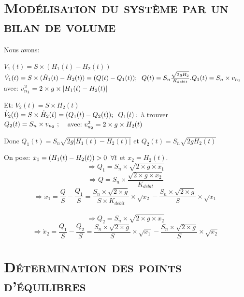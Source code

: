 \section{\textsc{Modélisation du système par un bilan de volume}}

	Nous avons:
\begin{center}

   $ V_1(t)=S\times (H_1(t)-H_2(t))$\\[0.5cm]   
    
  $\dot{V}_1(t)= S \times (\dot{H}_1(t)-\dot{H}_2(t))=(Q(t)-Q_1(t)); \hspace{2mm} Q(t) = S_n \frac{\sqrt{2gH_2}} {K_{debit}}.\\[0.5cm]
  
    Q_1(t)=S_n \times v_{n_1} \hspace{3mm}$ avec:$\hspace{1mm}  v^2_{n_1} = 2 \times g\times |H_1(t)-H_2(t)| \\[1 cm]$
 
 Et:
    $V_2(t)=S\times H_2(t)$\\[0.5cm]

   $ \dot{V}_2(t) = S \times \dot{H}_2(t)=(Q_1(t)-Q_2(t)); \hspace{2mm} Q_1(t):$ à trouver\\[0.5cm]
    
    $Q_2(t) = S_n \times v_{n_2} \ ; \hspace{3mm}$ avec:$\hspace{1mm}  v^2_{n_2} = 2 \times g \times H_2(t)    \\[1 cm]$
\end{center} 


Donc $Q_1(t)=S_n\sqrt{2g |H_1(t)-H_2(t)|}$ et $ Q_2(t)=S_n\sqrt{2gH_2(t)} $\\
\par On pose:  $ x_1 = (H_1(t) - H_2(t)) > 0 \hspace{2mm} \forall t$ et $ x_2 = H_2(t) $.\\

\[\Longrightarrow Q_1=S_n\times \sqrt{2\times g \times x_1}\]
\[\Longrightarrow Q=S_n\times \frac{\sqrt{2\times g \times x_2}}{K_{debit}} \]
\[\Longrightarrow \dot{x}_1=\frac{Q}{S}-\frac{Q_1}{S}= \frac{S_n\times \sqrt{2\times g }}{S \times K_{debit} } \times \sqrt{x_2} - \frac{S_n\times \sqrt{2\times g }}{S} \times \sqrt{x_1} \] \\[0.5 cm]

\[\Longrightarrow Q_2=S_n\times \sqrt{2\times g \times x_2}\]
\[\Longrightarrow \dot{x}_2=\frac{Q_1}{S}-\frac{Q_2}{S}= \frac{S_n\times \sqrt{2\times g }}{S} \times \sqrt{x_1} - \frac{S_n\times \sqrt{2\times g }}{S} \times \sqrt{x_2} \]
 

\section{\textsc{Détermination des points d'équilibres}}
 
	\par 


